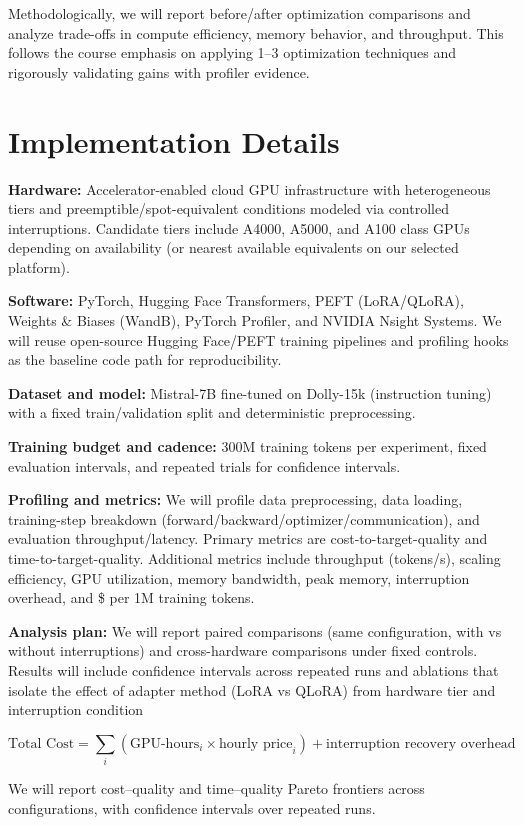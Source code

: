 \documentclass[10pt]{article}
\begin{document}
Methodologically, we will report before/after optimization comparisons and analyze trade-offs in compute efficiency, memory behavior, and throughput. This follows the course emphasis on applying 1--3 optimization techniques and rigorously validating gains with profiler evidence.

\section{Implementation Details}
\textbf{Hardware:} Accelerator-enabled cloud GPU infrastructure with heterogeneous tiers and preemptible/spot-equivalent conditions modeled via controlled interruptions. Candidate tiers include A4000, A5000, and A100 class GPUs depending on availability (or nearest available equivalents on our selected platform).

\textbf{Software:} PyTorch, Hugging Face Transformers, PEFT (LoRA/QLoRA), Weights \& Biases (WandB), PyTorch Profiler, and NVIDIA Nsight Systems. We will reuse open-source Hugging Face/PEFT training pipelines and profiling hooks as the baseline code path for reproducibility.

\textbf{Dataset and model:} Mistral-7B fine-tuned on Dolly-15k (instruction tuning) with a fixed train/validation split and deterministic preprocessing.

\textbf{Training budget and cadence:} 300M training tokens per experiment, fixed evaluation intervals, and repeated trials for confidence intervals.

\textbf{Profiling and metrics:} We will profile data preprocessing, data loading, training-step breakdown (forward/backward/optimizer/communication), and evaluation throughput/latency. Primary metrics are cost-to-target-quality and time-to-target-quality. Additional metrics include throughput (tokens/s), scaling efficiency, GPU utilization, memory bandwidth, peak memory, interruption overhead, and \$ per 1M training tokens.

\textbf{Analysis plan:} We will report paired comparisons (same configuration, with vs without interruptions) and cross-hardware comparisons under fixed controls. Results will include confidence intervals across repeated runs and ablations that isolate the effect of adapter method (LoRA vs QLoRA) from hardware tier and interruption condition

\[
\text{Total Cost} = \sum_i (\text{GPU-hours}_i \times \text{hourly price}_i) + \text{interruption recovery overhead}
\]

We will report cost--quality and time--quality Pareto frontiers across configurations, with confidence intervals over repeated runs.
\end{document}
